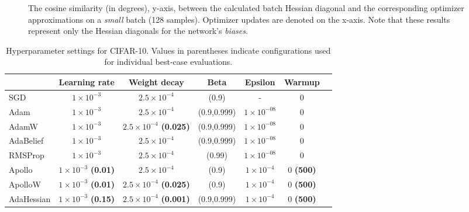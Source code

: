 \begin{figure}[h!]
    \centering
    \begin{tabular}{cc}
         \\ %
    \end{tabular}
    \caption{The cosine similarity (in degrees), y-axis, between the calculated batch Hessian diagonal and the corresponding optimizer approximations on a \emph{small} batch (128 samples).
    Optimizer updates are denoted on the x-axis.
    Note that these results represent only the Hessian diagonals for the network's \emph{biases}.}
    \label{fig:cosine-bias-big-batch}
\end{figure}

\begin{table}[h!]
    \centering
    \caption{Hyperparameter settings for CIFAR-10. Values in parentheses indicate configurations used for individual best-case evaluations. }
    \label{tab:cifar-real-comp}
    \begin{tabular}{lcccccc}  %
        \toprule
        & \textbf{Learning rate} & \textbf{Weight decay} & \textbf{Beta} & \textbf{Epsilon} & \textbf{Warmup}  \\
        \midrule
        SGD         & $1 \times 10^{-3}$ & $2.5 \times 10 ^{-4} $ & (0.9) & - & 0  \\
        Adam        & $1 \times 10^{-3}$ & $2.5 \times 10 ^{-4} $ & (0.9,0.999) & $1 \times 10^{-08}$ & 0     \\
        AdamW       & $1 \times 10^{-3}$ & $2.5 \times 10 ^{-4} $ \textbf{(0.025)} & (0.9,0.999) & $1 \times 10^{-08}$ & 0 \\
        AdaBelief   & $1 \times 10^{-3}$ & $2.5 \times 10 ^{-4} $ & (0.9,0.999) & $1 \times 10^{-08}$ & 0  \\
        RMSProp     & $1 \times 10^{-3}$ & $2.5 \times 10 ^{-4} $ & (0.99) & $1 \times 10^{-08}$ & 0 \\
        Apollo      & $1 \times 10^{-3}$ \textbf{(0.01)} & $2.5 \times 10 ^{-4}$ & (0.9) & $1 \times 10 ^{-4} $ & 0 \textbf{(500)}\\
        ApolloW     & $1 \times 10^{-3}$ \textbf{(0.01)} & $2.5 \times 10 ^{-4} $ \textbf{(0.025)} & (0.9) & $1 \times 10 ^{-4} $ & 0 \textbf{(500)}  \\
        AdaHessian  & $1 \times 10^{-3}$ \textbf{(0.15)} & $2.5 \times 10 ^{-4}$  \textbf{(0.001)} & (0.9,0.999) &$1 \times 10 ^{-4} $& 0 \textbf{(500)} \\
        \bottomrule
    \end{tabular}
\end{table}

